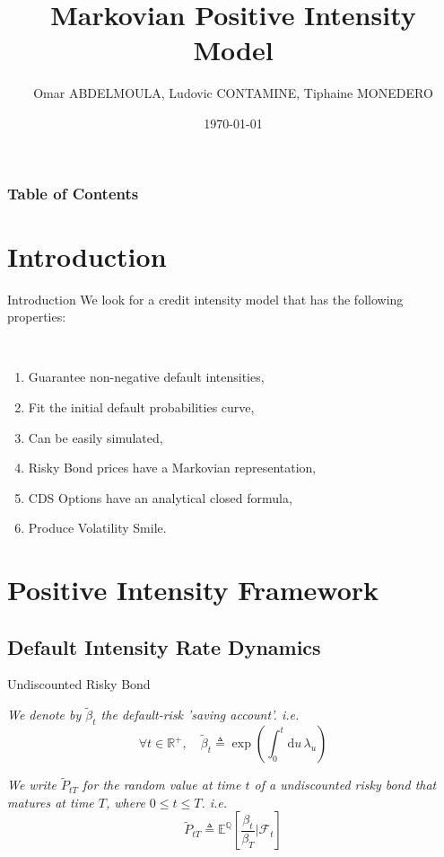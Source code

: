 \documentclass[serif]{beamer}
\title[PIM]{Markovian Positive Intensity Model}
\institute[]{Mechanical Engineering \\Ontario Tech University }
\author[Fixed Income]{
	Omar ABDELMOULA, Ludovic CONTAMINE, Tiphaine MONEDERO
}
\institute[]{Fixed Income Quantitative Research, \\Natixis}
\date{\today}
\newcommand\EE {\mathbb{E}}
\newcommand\QQ {\mathbb{Q}}
\newcommand\F {\mathcal{F}}
\newcommand\RR {\mathbb{R}}
\numberwithin{equation}{section}
\newcommand\tP{\tilde P}
\newcommand\du{\mathrm{d}u\,}
\newcommand\tbe{\tilde\beta}
\begin{document}
\begin{frame}
 \titlepage
\end{frame}








\begin{frame}
\frametitle{Table of Contents}
\tableofcontents[hideallsubsections]
\end{frame}

\section{Introduction}

\begin{frame}{Introduction }
We look for a credit intensity model that has the following  properties:

~\newline

 \begin{enumerate}
 \item<1-> Guarantee non-negative default intensities,
 \item<2-> Fit the initial default probabilities curve,
 \item<3->  Can be easily simulated,
 \item<4-> Risky Bond prices have a Markovian representation,
 \item<5-> CDS Options have an analytical closed formula,
 \item<6-> Produce Volatility Smile.
\end{enumerate}
\end{frame}
\section{Positive Intensity Framework}

\subsection{Default Intensity Rate Dynamics}

\begin{frame}{Undiscounted Risky Bond}
\begin{Definition} \em{
We denote by $\tbe_{t}$  the default-risk 'saving account'. i.e.
$$\forall t \in \RR^+,\quad \tbe_t \triangleq \exp\left(\int_0^t {\du \lambda_u}\right)$$}
\end{Definition}


\begin{Definition} \em{
We write $\tP_{tT}$ for the random value at time $t$ of a undiscounted risky bond that matures at time $T$, where $0 \leq t \leq T$. i.e.
$$\tP_{tT} \triangleq \EE^\QQ\left[\frac{\beta_t}{\beta_T}\big|\F_t\right]$$}
\end{Definition}
\end{frame}
\end{document}
